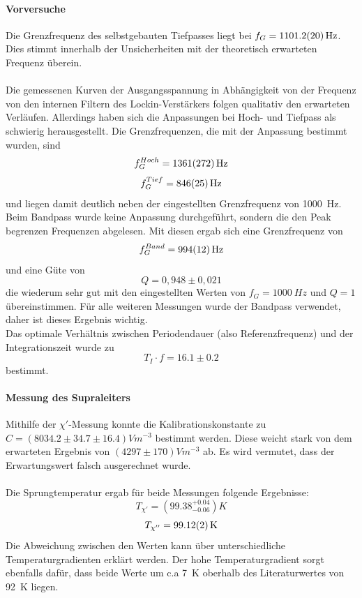 \documentclass[12pt,a4paper]{article}
\begin{document}
\paragraph{Vorversuche}
Die Grenzfrequenz des selbstgebauten Tiefpasses liegt bei $f_G = \SI{1101,2 \pm 2,0}{Hz}$. Dies stimmt innerhalb der Unsicherheiten mit der theoretisch erwarteten Frequenz überein.\\
\\
Die gemessenen Kurven der Ausgangsspannung in Abhängigkeit von der Frequenz von den internen Filtern des Lockin-Verstärkers folgen qualitativ den erwarteten Verläufen. Allerdings haben sich die Anpassungen bei Hoch- und Tiefpass als schwierig herausgestellt. Die Grenzfrequenzen, die mit der Anpassung bestimmt wurden, sind
\begin{equation*}
f_G^{Hoch} = \SI{1361 \pm 272}{Hz}
\end{equation*}
\begin{equation*}
f_G^{Tief} = \SI{846 \pm 25}{Hz}
\end{equation*}
und liegen damit deutlich neben der eingestellten Grenzfrequenz von \SI{1000}{Hz}.\\
Beim Bandpass wurde keine Anpassung durchgeführt, sondern die den Peak begrenzen Frequenzen abgelesen. Mit diesen ergab sich eine Grenzfrequenz von
\begin{equation*}
f_G^{Band} = \SI{994 \pm 12}{Hz}
\end{equation*}
und eine Güte von
\begin{equation*}
Q = 0,948 \pm 0,021
\end{equation*}
die wiederum sehr gut mit den eingestellten Werten von $f_G = \SI{1000}{Hz}$ und $Q=1$ übereinstimmen. Für alle weiteren Messungen wurde der Bandpass verwendet, daher ist dieses Ergebnis wichtig.
\\
Das optimale Verhältnis zwischen Periodendauer (also Referenzfrequenz) und der Integrationszeit wurde zu
\begin{equation*}
T_I \cdot f = 16.1\pm 0.2
\end{equation*}
bestimmt.
\paragraph{Messung des Supraleiters}
Mithilfe der $\chi'$-Messung konnte die Kalibrationskonstante zu $C = (8034.2\pm 34.7\pm 16.4)\si{Vm^{-3}}$ bestimmt werden. Diese weicht stark von dem erwarteten Ergebnis von $(4297\pm 170)\si{Vm^{-3}}$ ab. Es wird vermutet, dass der Erwartungswert falsch ausgerechnet wurde.\\
\\
Die Sprungtemperatur ergab für beide Messungen folgende Ergebnisse:
\begin{equation*}
T_{\chi'} = (99.38^{+0.04}_{-0.06}) \si{K}
\end{equation*}
\begin{equation*}
T_{\chi''} = \SI{99.12\pm 0.02}{K}
\end{equation*}
Die Abweichung zwischen den Werten kann über unterschiedliche Temperaturgradienten erklärt werden. Der hohe Temperaturgradient sorgt ebenfalls dafür, dass beide Werte um c.a \SI{7}{K} oberhalb des Literaturwertes von \SI{92}{K} liegen.
\end{document}
